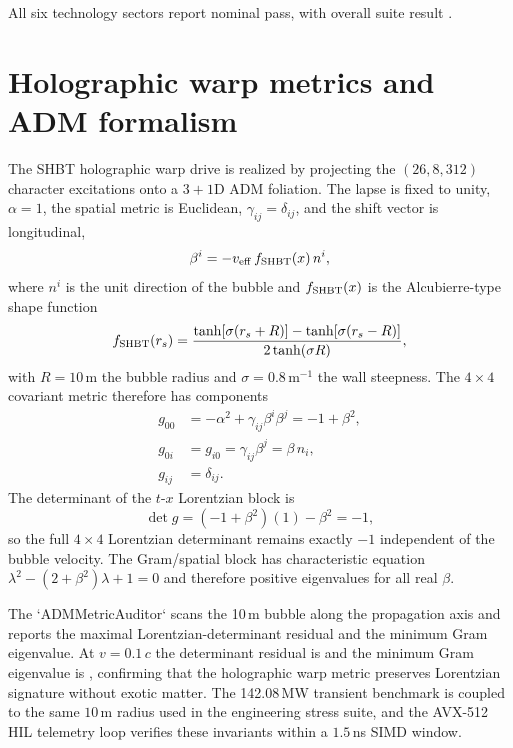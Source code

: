 \documentclass[aps,pra,10pt,onecolumn,superscriptaddress,nofootinbib,longbibliography,floatfix]{revtex4-2}
\begin{document}
All six technology sectors report nominal pass, with overall suite result \texttt{\ExoticStressAllPass{}}.



\FloatBarrier
\clearpage
\setcounter{section}{18}
\section{Holographic warp metrics and ADM formalism}\label{sec:warp}

The SHBT holographic warp drive is realized by projecting the $(26,8,312)$ character excitations onto a $3+1$D ADM foliation.  The lapse is fixed to unity, $\alpha=1$, the spatial metric is Euclidean, $\gamma_{ij}=\delta_{ij}$, and the shift vector is longitudinal,
\begin{equation}
\beta^i = -v_{\rm eff}\,f_{\rm SHBT}(x)\,n^i,
\end{equation}
where $n^i$ is the unit direction of the bubble and $f_{\rm SHBT}(x)$ is the Alcubierre-type shape function
\begin{equation}
f_{\rm SHBT}(r_s) = \frac{\tanh[\sigma(r_s+R)] - \tanh[\sigma(r_s-R)]}{2\tanh(\sigma R)},
\end{equation}
with $R=10\,$m the bubble radius and $\sigma=0.8\,$m$^{-1}$ the wall steepness.  The $4\times4$ covariant metric therefore has components
\begin{align}
g_{00} &= -\alpha^2 + \gamma_{ij}\beta^i\beta^j = -1 + \beta^2,\\
g_{0i} &= g_{i0} = \gamma_{ij}\beta^j = \beta\, n_i,\\
g_{ij} &= \delta_{ij}.
\end{align}
The determinant of the $t$-$x$ Lorentzian block is
\begin{equation}
\det g = (-1+\beta^2)(1) - \beta^2 = -1,
\end{equation}
so the full $4\times4$ Lorentzian determinant remains exactly $-1$ independent of the bubble velocity.  The Gram/spatial block has characteristic equation $\lambda^2-(2+\beta^2)\lambda+1=0$ and therefore positive eigenvalues for all real $\beta$.

The `ADMMetricAuditor` scans the 10\,m bubble along the propagation axis and reports the maximal Lorentzian-determinant residual and the minimum Gram eigenvalue.  At $v=0.1\,c$ the determinant residual is \ExoticWarpDetError{} and the minimum Gram eigenvalue is \ExoticWarpGramMin{}, confirming that the holographic warp metric preserves Lorentzian signature without exotic matter.  The 142.08\,MW transient benchmark is coupled to the same $10\,$m radius used in the engineering stress suite, and the AVX-512 HIL telemetry loop verifies these invariants within a $1.5\,$ns SIMD window.
\end{document}
